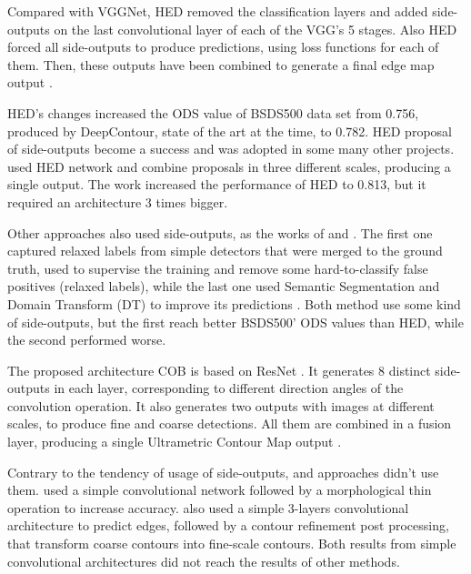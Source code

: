 Compared with VGGNet, HED removed the classification layers and added side-outputs on the last convolutional layer of each of the VGG's 5 stages.
Also HED forced all side-outputs to produce predictions, using loss functions for each of them.
Then, these outputs have been combined to generate a final edge map output \cite{HED:2015}.

HED's changes increased the ODS value of BSDS500 data set \cite{amfm_pami2011} from 0.756, produced by DeepContour, state of the art at the time, to 0.782.
HED proposal of side-outputs become a success and was adopted in some many other projects.
\cite{Kokkinos:2016} used HED network and combine proposals in three different scales, producing a single output.
The work increased the performance of HED to 0.813, but it required an architecture 3 times bigger.

Other approaches also used side-outputs, as the works of \cite{LearningRelaxed:2016:7780401} and \cite{SemanticSeg:2016:7780861}.
The first one captured relaxed labels from simple detectors that were merged to the ground truth, used to supervise the training and remove some hard-to-classify false positives (relaxed labels), while the last one used Semantic Segmentation and Domain Transform (DT) to improve its predictions \cite{LearningRelaxed:2016:7780401} \cite{SemanticSeg:2016:7780861}.
Both method use some kind of side-outputs, but the first reach better BSDS500' ODS values than HED, while the second performed worse.

The proposed architecture COB is based on ResNet \cite{RESNET:2016:7780459}.
It generates 8 distinct side-outputs in each layer, corresponding to different direction angles of the convolution operation.
It also generates two outputs with images at different scales, to produce fine and coarse detections.
All them are combined in a fusion layer, producing a single Ultrametric Contour Map output \cite{COB:2018:7917294}.

Contrary to the tendency of usage of side-outputs, \cite{EdgeCNN:Wang201612} and \cite{ContourDetect:2017:8124495} approaches didn't use them.
\cite{EdgeCNN:Wang201612} used a simple convolutional network followed by a morphological thin operation to increase accuracy.
\cite{ContourDetect:2017:8124495} also used a simple 3-layers convolutional architecture to predict edges, followed by a contour refinement post processing, that transform coarse contours into fine-scale contours.
Both results from simple convolutional architectures did not reach the results of other methods. %

